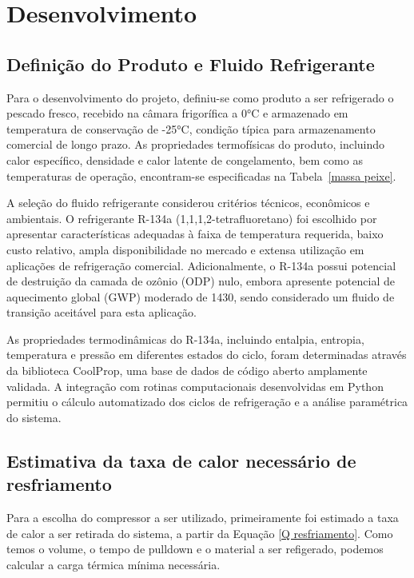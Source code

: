 \chapter{Desenvolvimento}

\section{Definição do Produto e Fluido Refrigerante}

Para o desenvolvimento do projeto, definiu-se como produto a ser refrigerado o pescado fresco, recebido na câmara frigorífica a 0°C e armazenado em temperatura de conservação de -25°C, condição típica para armazenamento comercial de longo prazo. As propriedades termofísicas do produto, incluindo calor específico, densidade e calor latente de congelamento, bem como as temperaturas de operação, encontram-se especificadas na Tabela~\ref{massa peixe}.

A seleção do fluido refrigerante considerou critérios técnicos, econômicos e ambientais. O refrigerante R-134a (1,1,1,2-tetrafluoretano) foi escolhido por apresentar características adequadas à faixa de temperatura requerida, baixo custo relativo, ampla disponibilidade no mercado e extensa utilização em aplicações de refrigeração comercial. Adicionalmente, o R-134a possui potencial de destruição da camada de ozônio (ODP) nulo, embora apresente potencial de aquecimento global (GWP) moderado de 1430, sendo considerado um fluido de transição aceitável para esta aplicação.

As propriedades termodinâmicas do R-134a, incluindo entalpia, entropia, temperatura e pressão em diferentes estados do ciclo, foram determinadas através da biblioteca CoolProp, uma base de dados de código aberto amplamente validada. A integração com rotinas computacionais desenvolvidas em Python permitiu o cálculo automatizado dos ciclos de refrigeração e a análise paramétrica do sistema.

\section{Estimativa da taxa de calor necessário de resfriamento}

Para a escolha do compressor a ser utilizado, primeiramente foi estimado a taxa de calor a ser retirada do sistema, a partir da Equação \ref{Q resfriamento}. Como temos o volume, o tempo de pulldown e o material a ser refigerado, podemos calcular a carga térmica mínima necessária.

